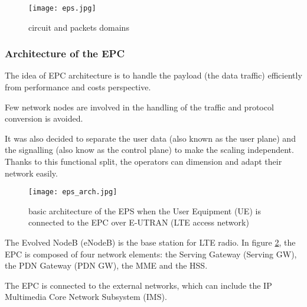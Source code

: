 \begin{figure}[H]
  \centering
  \texttt{[image: eps.jpg]}
  \caption{circuit and packets domains}
  \label{fig:eps}
\end{figure}

\subsubsection{Architecture of the EPC}

The idea of EPC architecture is to handle the payload (the data traffic)
efficiently from performance and costs perspective.

Few network nodes are involved in the handling of the traffic and protocol
conversion is avoided.

It was also decided to separate the user data (also known as the user plane)
and the signalling (also know as the control plane) to make the scaling
independent.
Thanks to this functional split, the operators can dimension and adapt their
network easily.

\begin{figure}[H]
  \centering
  \texttt{[image: eps\_arch.jpg]}
  \caption{basic architecture of the EPS when the User Equipment
(UE) is connected to the EPC over E-UTRAN (LTE access network)}
  \label{fig:eps_arch}
\end{figure}

The Evolved NodeB (eNodeB) is the base station for LTE radio.
In figure \ref{fig:eps_arch}, the EPC is composed of four network elements:
the Serving Gateway (Serving GW), the PDN Gateway (PDN GW), the MME and
the HSS.

The EPC is connected to the external networks, which can include the IP
Multimedia Core Network Subsystem (IMS).
